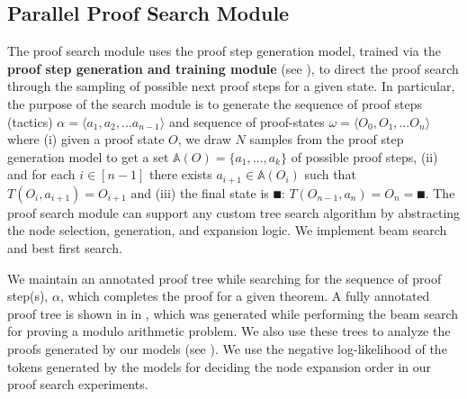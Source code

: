 \subsection{Parallel Proof Search Module}
\label{sec:searching-module}
The proof search module uses the proof step generation model, trained via the \textbf{proof step generation and training module} (see ), to direct the proof search through the sampling of possible next proof steps for a given state. In particular, the purpose of the search module is to generate the sequence of proof steps (tactics) $\alpha = \langle a_1, a_2, \dots a_{n-1}\rangle$ and sequence of proof-states $\omega = \langle O_0, O_1, \dots O_{n} \rangle$ where (i) given a proof state $O$, we draw $N$ samples from the proof step generation model to get a set $\mathbb{A}(O) = \{a_1, \dots, a_k\}$ of possible proof steps, (ii) and for each $i \in [n-1]$ there exists $a_{i+1} \in \mathbb{A}(O_i)$ such that $T(O_i, a_{i+1}) = O_{i+1}$ and (iii) the final state is $\QED$: $T(O_{n-1}, a_n) = O_n = \QED$. 
The proof search module can support any custom tree search algorithm by abstracting the node selection, generation, and expansion logic. We implement beam search and best first search. 

We maintain an annotated proof tree while searching for the sequence of proof step(s), $\alpha$, which completes the proof for a given theorem. A fully annotated proof tree is shown in  in , which was generated while performing the beam search for proving a modulo arithmetic problem. We also use these trees to analyze the proofs generated by our models (see ). We use the negative log-likelihood of the tokens generated by the \proofwala\; models for deciding the node expansion order in our proof search experiments.


